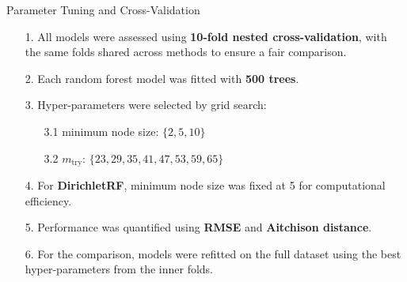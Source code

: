 \begin{frame}{Parameter Tuning and Cross-Validation}

\begin{itemize}
    \item[1.] All models were assessed using \textbf{10-fold nested cross-validation},
    with the same folds shared across methods to ensure a fair comparison.

    \item[2.]  Each random forest model was fitted with \textbf{500 trees}.

    \item[3.]  Hyper-parameters were selected by grid search:
    \begin{itemize}
        \item[3.1]  minimum node size: $\{2, 5, 10\}$
        \item[3.2] $m_{\mathrm{try}}$: $\{23, 29, 35, 41, 47, 53, 59, 65\}$
    \end{itemize}

    \item[4.] For \textbf{DirichletRF}, minimum node size was fixed at 5 for computational efficiency.

    \item[5.] Performance was quantified using \textbf{RMSE} and \textbf{Aitchison distance}.

    \item[6.] For the  comparison, models were refitted on the full dataset using
    the best hyper-parameters from the inner folds.
\end{itemize}

\end{frame}





